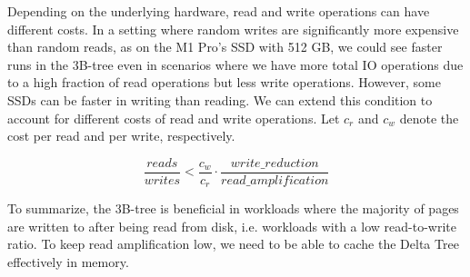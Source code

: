Depending on the underlying hardware, read and write operations can have different costs.
In a setting where random writes are significantly more expensive than random reads, as on the M1 Pro's SSD with 512 GB, we could see faster runs in the 3B-tree even in scenarios where we have more total \ac{IO} operations due to a high fraction of read operations but less write operations.
However, some SSDs can be faster in writing than reading.
We can extend this condition to account for different costs of read and write operations.
Let $c_r$ and $c_w$ denote the cost per read and per write, respectively.  

\begin{equation}
\frac{reads}{writes} < \frac{c_w}{c_r} \cdot
\frac{write\_reduction}{read\_amplification}
\label{eq:ratio_condition_costs}
\end{equation}

To summarize, the 3B-tree is beneficial in workloads where the majority of pages are written to after being read from disk, i.e. workloads with a low read-to-write ratio.
To keep read amplification low, we need to be able to cache the Delta Tree effectively in memory.





